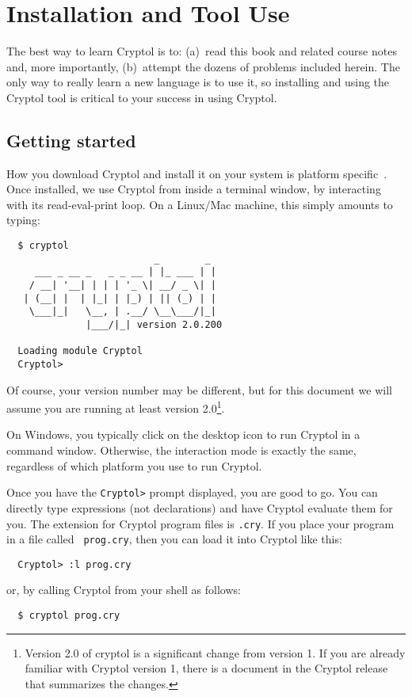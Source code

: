
\chapter{Installation and Tool Use}
\label{cha:inst-tool-use}

The best way to learn Cryptol is to: (a)~read this book and related
course notes and, more importantly, (b)~attempt the dozens of problems
included herein.  The only way to really learn a new language is to
use it, so installing and using the Cryptol tool is critical to your
success in using Cryptol.

\section{Getting started}
\label{sec:gettingstarted}

How you download Cryptol and install it on your system is platform
specific~\cite{CryptolWWW}.  Once installed, we use Cryptol from
inside a terminal window, by interacting with its read-eval-print
loop. On a Linux/Mac machine, this simply amounts to typing:
\begin{Verbatim}
  $ cryptol
                          _        _
     ___ _ __ _   _ _ __ | |_ ___ | |
    / __| '__| | | | '_ \| __/ _ \| |
   | (__| |  | |_| | |_) | || (_) | |
    \___|_|   \__, | .__/ \__\___/|_|
              |___/|_| version 2.0.200

  Loading module Cryptol
  Cryptol>
\end{Verbatim}

\noindent Of course, your version number may be different, but for
this document we will assume you are running at least version
2.0\footnote{Version 2.0 of cryptol is a significant change from
  version 1. If you are already familiar with Cryptol version 1, there
  is a document in the Cryptol release that summarizes the changes.}.

On Windows, you typically click on the desktop icon to run Cryptol in
a command window.  Otherwise, the interaction mode is exactly the
same, regardless of which platform you use to run Cryptol.

Once you have the {\tt Cryptol>} prompt displayed, you are good to go.
You can directly type expressions (not declarations) and have Cryptol
evaluate them for you.  The extension for Cryptol program files is
{\tt .cry}.  If you place your program in a file called {\tt
  prog.cry}, then you can load it into Cryptol like this:
\begin{Verbatim}
  Cryptol> :l prog.cry
\end{Verbatim}
\noindent or, by calling Cryptol from your shell as follows:
\begin{Verbatim}
  $ cryptol prog.cry
\end{Verbatim}

